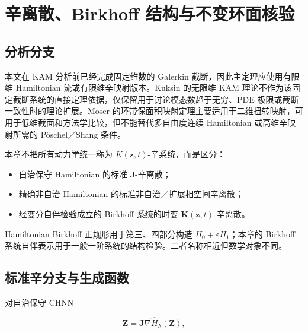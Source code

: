 \section{辛离散、Birkhoff 结构与不变环面核验}\label{sec:symplectic-kam}

\subsection{分析分支}\label{sec:symplectic-kam-5-1}

本文在 KAM 分析前已经完成固定维数的 Galerkin 截断，因此主定理应使用有限维 Hamiltonian 流或有限维辛映射版本。Kuksin 的无限维 KAM 理论\cite{Kuksin1993InfiniteDimensionalKAM}不作为该固定截断系统的直接定理依据，仅保留用于讨论模态数趋于无穷、PDE 极限或截断一致性时的理论扩展。Moser 的环带保面积映射定理\cite{Moser1962InvariantCurves}主要适用于二维扭转映射，可用于低维截面和方法学比较，但不能替代多自由度连续 Hamiltonian 或高维辛映射所需的 Pöschel／Shang 条件。\cite{Shang1999KAMAlgorithms,Shang2000KAMMappings,Poschel2001KAMLecture}

本章不把所有动力学统一称为 \(K\left( \mathbf{z},t \right)\)-辛系统，而是区分：

\begin{itemize}
\tightlist
\item
  自治保守 Hamiltonian 的标准 \(\mathbf{J}\)-辛离散；
\item
  精确非自治 Hamiltonian 的标准非自治／扩展相空间辛离散；
\item
  经变分自伴检验成立的 Birkhoff 系统的时变 \(\mathbf{K}\left( \mathbf{z},t \right)\)-辛离散。
\end{itemize}

Hamiltonian Birkhoff 正规形用于第三、四部分构造 \(H_{0} + \varepsilon H_{1}\)；本章的 Birkhoff 系统自伴表示用于一般一阶系统的结构检验。二者名称相近但数学对象不同。

\subsection{标准辛分支与生成函数}\label{sec:symplectic-kam-5-2}

对自治保守 CHNN

\begin{equation}
\label{eq:symplectic-kam-5-1}
\dot{\mathbf{Z}} = \mathbf{J}\nabla{\widehat{H}}_{\lambda}\left( \mathbf{Z} \right),
\end{equation}

